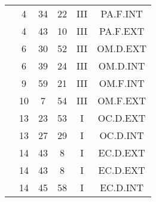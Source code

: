 \documentclass[12pt, a4paper]{article}
\begin{document}
\begin{multicols}{3}
{\begin{tabular}{c c c c c c}
	 	 	 	 & 4 & 34 & 22 & III & PA.F.INT\\%
	 	 	 	 & 4 & 43 & 10 & III & PA.F.EXT\\%
	 	 	 	 & 6 & 30 & 52 & III & OM.D.EXT\\%
	 	 	 	 & 6 & 39 & 24 & III & OM.D.INT\\%
	 	 	 	 & 9 & 59 & 21 & III & OM.F.INT\\%
	 	 	 	 & 10 & 7 & 54 & III & OM.F.EXT\\%
	 	 	 	 & 13 & 23 & 53 & I & OC.D.EXT\\%
	 	 	 	 & 13 & 27 & 29 & I & OC.D.INT\\%
	 	 	 	 & 14 & 43 & 8 & I & EC.D.EXT\\%
	 	 	 	 & 14 & 43 & 8 & I & EC.D.EXT\\%
	 	 	 	 & 14 & 45 & 58 & I & EC.D.INT\\%
	 	 \end{tabular}
 	}
\end{multicols}
\end{document}
